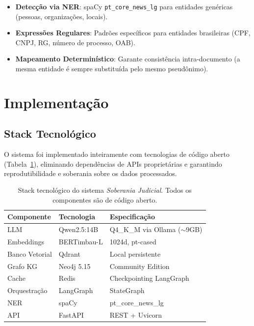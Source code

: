 \documentclass[journal,10pt]{IEEEtran}
\begin{document}
\begin{itemize}    \item \textbf{Detec\c{c}\~{a}o via NER}: spaCy \texttt{pt\_core\_news\_lg} para entidades gen\'{e}ricas (pessoas, organiza\c{c}\~{o}es, locais).
    \item \textbf{Express\~{o}es Regulares}: Padr\~{o}es espec\'{i}ficos para entidades brasileiras (CPF, CNPJ, RG, n\'{u}mero de processo, OAB).
    \item \textbf{Mapeamento Determin\'{i}stico}: Garante consist\^{e}ncia intra-documento (a mesma entidade \'{e} sempre substitu\'{i}da pelo mesmo pseudônimo).
\end{itemize}

\section{Implementa\c{c}\~{a}o}

\subsection{Stack Tecnol\'{o}gico}

O sistema foi implementado inteiramente com tecnologias de c\'{o}digo aberto (Tabela~\ref{tab:stack}), eliminando depend\^{e}ncias de APIs propriet\'{a}rias e garantindo reprodutibilidade e soberania sobre os dados processados.

\begin{table}[!t]
\centering
\caption{Stack tecnol\'{o}gico do sistema \textit{Soberania Judicial}. Todos os componentes s\~{a}o de c\'{o}digo aberto.}
\label{tab:stack}
\small
\begin{tabular}{p{1.7cm}p{2.0cm}p{3.0cm}}
\toprule
\textbf{Componente} & \textbf{Tecnologia} & \textbf{Especifica\c{c}\~{a}o} \\
\midrule
LLM & Qwen2.5:14B & Q4\_K\_M via Ollama ($\sim$9GB) \\
Embeddings & BERTimbau-L & 1024d, pt-cased \\
Banco Vetorial & Qdrant & Local persistente \\
Grafo KG & Neo4j 5.15 & Community Edition \\
Cache & Redis & Checkpointing LangGraph \\
Orquestra\c{c}\~{a}o & LangGraph & StateGraph \\
NER & spaCy & pt\_core\_news\_lg \\
API & FastAPI & REST + Uvicorn \\
\bottomrule
\end{tabular}
\end{table}
\end{document}
